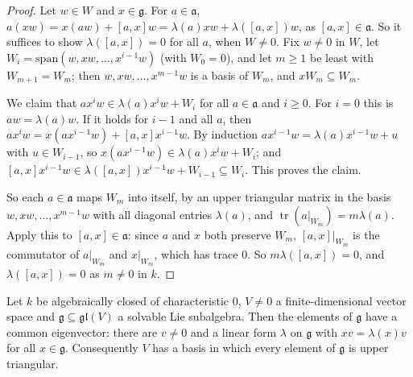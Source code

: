 \begin{proof}
Let $w \in W$ and $x \in \mathfrak{g}$. For $a \in \mathfrak{a}$, $a(xw) = x(aw) + [a, x]w = \lambda(a)xw + \lambda([a, x])w$, as $[a, x] \in \mathfrak{a}$. So it suffices
to show $\lambda([a, x]) = 0$ for all $a$, when $W \neq 0$. Fix $w \neq 0$ in $W$, let $W_i = \mathrm{span}(w, xw, \ldots, x^{i-1}w)$ (with $W_0 = 0$), and let $m \geq 1$ be
least with $W_{m+1} = W_m$; then $w, xw, \ldots, x^{m-1}w$ is a basis of $W_m$, and $xW_m \subseteq W_m$.

We claim that $ax^iw \in \lambda(a)x^iw + W_i$ for all $a \in \mathfrak{a}$ and $i \geq 0$. For $i = 0$ this is $aw = \lambda(a)w$. If it holds for $i - 1$ and all
$a$, then $ax^iw = x(ax^{i-1}w) + [a, x]x^{i-1}w$. By induction $ax^{i-1}w = \lambda(a)x^{i-1}w + u$ with $u \in W_{i-1}$, so
$x(ax^{i-1}w) \in \lambda(a)x^iw + W_i$; and $[a, x]x^{i-1}w \in \lambda([a, x])x^{i-1}w + W_{i-1} \subseteq W_i$. This proves the claim.

So each $a \in \mathfrak{a}$ maps $W_m$ into itself, by an upper triangular matrix in the basis $w, xw, \ldots, x^{m-1}w$ with all diagonal entries $\lambda(a)$, and
$\operatorname{tr}(a|_{W_m}) = m\lambda(a)$. Apply this to $[a, x] \in \mathfrak{a}$: since $a$ and $x$ both preserve $W_m$, $[a, x]|_{W_m}$ is the commutator of
$a|_{W_m}$ and $x|_{W_m}$, which has trace $0$. So $m\lambda([a, x]) = 0$, and $\lambda([a, x]) = 0$ as $m \neq 0$ in $k$.
\end{proof}

\begin{theorem}\label{representation-theory:theorem-lie}
Let $k$ be algebraically closed of characteristic $0$, $V \neq 0$ a finite-dimensional vector space and $\mathfrak{g} \subseteq \mathfrak{gl}(V)$ a solvable Lie
subalgebra. Then the elements of $\mathfrak{g}$ have a common eigenvector: there are $v \neq 0$ and a linear form $\lambda$ on $\mathfrak{g}$ with $xv = \lambda(x)v$ for
all $x \in \mathfrak{g}$. Consequently $V$ has a basis in which every element of $\mathfrak{g}$ is upper triangular.
\end{theorem}

